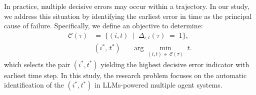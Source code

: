 In practice, multiple decisive errors may occur within a trajectory. In our study, we address this situation by identifying the earliest error in time as the principal cause of failure. Specifically, we define an objective to determine:
\begin{align}
\mathcal{C}(\tau) 
&=\; 
\bigl\{
  (i,t) \;\mid\; \Delta_{i,t}(\tau) \;=\; 1
\bigr\},
\label{eq:culprit_set}
\\[5pt] 
&(i^*,\, t^*)
=\;
\arg\min_{(i,t)\,\in\,\mathcal{C}(\tau)} 
\; t. \nonumber
\label{eq:earliest_culprit}
\end{align}
which selects the pair $(i^*, t^*)$ yielding the highest decisive error indicator with earliest time step.
In this study, the research problem focuses on the automatic identification of the $(i^*, t^*)$ in LLMs-powered multiple agent systems. 


